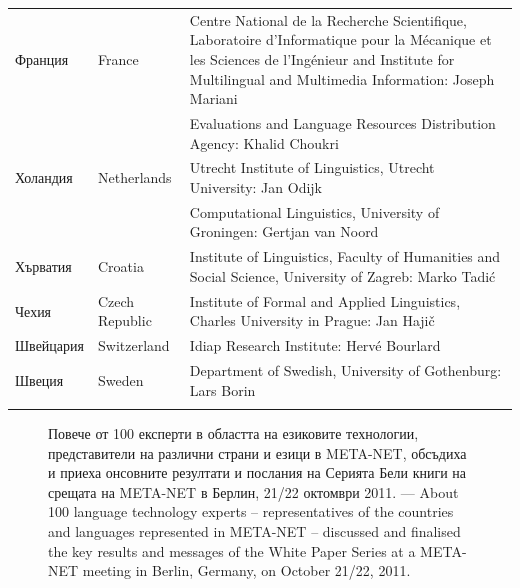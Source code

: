 \begin{longtable}{@{}llp{110mm}@{}}
    Франция & \textcolor{grey1}{France} & Centre National de la Recherche Scientifique, Laboratoire d'Informatique pour la Mécanique et les Sciences de l'Ingénieur and Institute for Multilingual and Multimedia Information: Joseph Mariani \\ \addlinespace
    & & Evaluations and Language Resources Distribution Agency: Khalid Choukri\\ \addlinespace 
    Холандия & \textcolor{grey1}{Netherlands} & Utrecht Institute of Linguistics, Utrecht University: Jan Odijk\\ \addlinespace 
    & & Computational Linguistics, University of Groningen: Gertjan van
    Noord\\ \addlinespace
    Хърватия & \textcolor{grey1}{Croatia} & Institute of Linguistics,
    Faculty of Humanities and Social Science, University of Zagreb:
    Marko Tadić \\ \addlinespace
    Чехия & \textcolor{grey1}{Czech Republic} & Institute of Formal and Applied Linguistics, Charles University in Prague: Jan Hajič \\ \addlinespace
    Швейцария & \textcolor{grey1}{Switzerland} & Idiap Research
    Institute: Hervé Bourlard \\ \addlinespace 
    Швеция & \textcolor{grey1}{Sweden} & Department of Swedish, University of Gothenburg: Lars Borin \\ \addlinespace 
  \end{longtable}
  \normalsize

  \renewcommand*{\figureformat}{}
  \renewcommand*{\captionformat}{}

  \begin{figure}[htb]
    \center
    \caption{Повече от 100 експерти в областта на езиковите технологии, представители на различни страни и езици в META-NET, обсъдиха и приеха онсовните резултати и послания на Серията Бели книги на срещата на  META-NET в Берлин, 21/22 октомври 2011. --- \textcolor{grey1}{About 100 language technology experts -- representatives of the countries and languages represented in META-NET -- discussed and finalised the key results and messages of the White Paper Series at a META-NET meeting in Berlin, Germany, on October 21/22, 2011.}}
    \medskip
  \end{figure}

